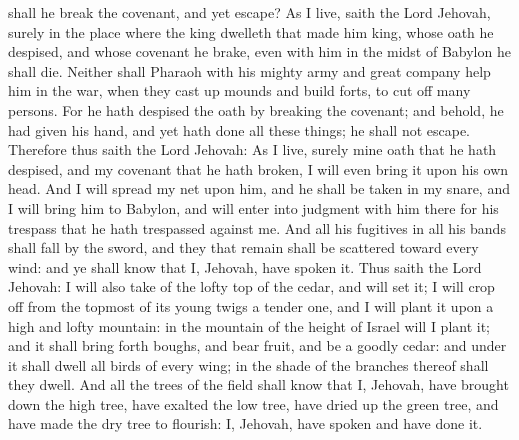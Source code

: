 shall he break the covenant, and yet escape? As I live, saith the Lord Jehovah, surely in the place where the king dwelleth that made him king, whose oath he despised, and whose covenant he brake, even with him in the midst of Babylon he shall die. Neither shall Pharaoh with his mighty army and great company help him in the war, when they cast up mounds and build forts, to cut off many persons. For he hath despised the oath by breaking the covenant; and behold, he had given his hand, and yet hath done all these things; he shall not escape. Therefore thus saith the Lord Jehovah: As I live, surely mine oath that he hath despised, and my covenant that he hath broken, I will even bring it upon his own head. And I will spread my net upon him, and he shall be taken in my snare, and I will bring him to Babylon, and will enter into judgment with him there for his trespass that he hath trespassed against me. And all his fugitives in all his bands shall fall by the sword, and they that remain shall be scattered toward every wind: and ye shall know that I, Jehovah, have spoken it.  Thus saith the Lord Jehovah: I will also take of the lofty top of the cedar, and will set it; I will crop off from the topmost of its young twigs a tender one, and I will plant it upon a high and lofty mountain: in the mountain of the height of Israel will I plant it; and it shall bring forth boughs, and bear fruit, and be a goodly cedar: and under it shall dwell all birds of every wing; in the shade of the branches thereof shall they dwell. And all the trees of the field shall know that I, Jehovah, have brought down the high tree, have exalted the low tree, have dried up the green tree, and have made the dry tree to flourish: I, Jehovah, have spoken and have done it. 

